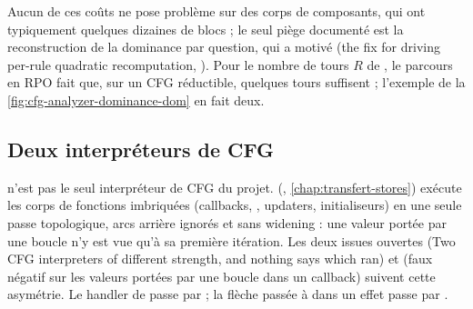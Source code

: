 Aucun de ces coûts ne pose problème sur des corps de composants, qui ont
typiquement quelques dizaines de blocs ; le seul piège documenté est la
reconstruction de la dominance par question, qui a motivé
 (\og the fix for  driving per-rule
quadratic recomputation\fg, ). Pour le
nombre de tours $R$ de , le parcours en RPO fait que,
sur un CFG réductible, quelques tours suffisent ; l'exemple de la
\cref{fig:cfg-analyzer-dominance-dom} en fait deux.

\subsection{Deux interpréteurs de CFG}

\begin{remarque}
   n'est pas le seul interpréteur de CFG du projet.
   (,
  \cref{chap:transfert-stores}) exécute les corps de fonctions imbriquées
  (callbacks, , updaters, initialiseurs) en une seule passe
  topologique, arcs arrière ignorés et sans widening : une valeur portée par
  une boucle n'y est vue qu'à sa première itération. Les deux issues ouvertes
   (\og Two CFG interpreters of different strength, and nothing
  says which ran\fg) et  (faux négatif sur les valeurs portées par
  une boucle dans un callback) suivent cette asymétrie. Le handler de
   passe par  ; la flèche passée à
   dans un effet passe par .
\end{remarque}

